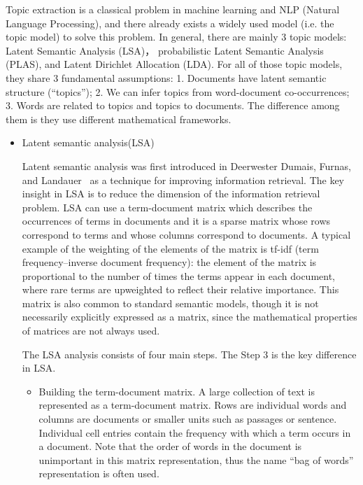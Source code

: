 Topic extraction is a classical problem in machine learning and
NLP (Natural Language Processing), and there already exists a widely used
model (i.e. the topic model) to solve this problem. In general, there are mainly 3
topic models: Latent Semantic Analysis (LSA)， probabilistic
Latent Semantic Analysis (PLAS), and Latent Dirichlet Allocation
(LDA). For all of those topic models, they share 3 fundamental
assumptions: 1. Documents have latent semantic structure (“topics”);
2. We can infer topics from word-document co-occurrences; 3. Words are
related to topics and topics to documents. The difference among them
is they use different mathematical frameworks.

\begin{itemize}

\item Latent semantic analysis(LSA)

Latent semantic analysis was first introduced in Deerwester Dumais, Furnas, and Landauer~\cite{deerwester1990indexing} as a technique for improving information retrieval. The key insight in LSA is to reduce the dimension of the information retrieval problem. LSA can use a term-document matrix which describes the occurrences of terms in documents and it is a sparse matrix whose rows correspond to terms and whose columns correspond to documents. A typical example of the weighting of the elements of the matrix is tf-idf (term frequency–inverse document frequency): the element of the matrix is proportional to the number of times the terms appear in each document, where rare terms are upweighted to reflect their relative importance. This matrix is also common to standard semantic models, though it is not necessarily explicitly expressed as a matrix, since the mathematical properties of matrices are not always used.

The LSA analysis consists of four main steps. The Step 3 is the key difference in LSA. 

\begin{itemize}

\item Building the term-document matrix.  A large collection of text is represented as a term-document matrix. Rows are individual words and columns are documents or smaller units such as passages or sentence. Individual cell entries contain the frequency with which a term occurs in a document. Note that the order of words in the document is unimportant in this matrix representation, thus the name “bag of words” representation is often used.



\end{itemize}
\end{itemize}
